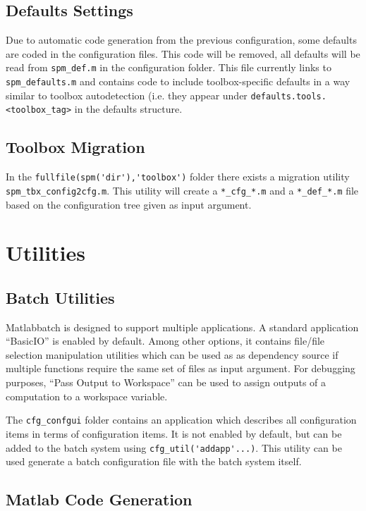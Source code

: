 \documentclass[a4paper]{book}
\begin{document}
\subsection{Defaults Settings}

Due to automatic code generation from the previous configuration, some
defaults are coded in the configuration files. This code will be removed, all
defaults will be read from \verb|spm_def.m| in the configuration folder. This
file currently links to \verb|spm_defaults.m| and contains code to include
toolbox-specific defaults in a way similar to toolbox autodetection (i.e. they
appear under \verb|defaults.tools.<toolbox_tag>| in the defaults structure.

\subsection{Toolbox Migration}

In the \verb|fullfile(spm('dir'),'toolbox')| folder there exists a migration
utility \verb|spm_tbx_config2cfg.m|. This utility will create a
\verb|*_cfg_*.m| and a \verb|*_def_*.m| file based on the configuration tree
given as input argument.

\section{Utilities}

\subsection{Batch Utilities}

Matlabbatch is designed to support multiple applications. A standard
application ``BasicIO'' is enabled by default. Among other options, it
contains file/file selection manipulation utilities which can be used as as
dependency source if multiple functions require the same set of files as input
argument. For debugging purposes, ``Pass Output to Workspace'' can be used to
assign outputs of a computation to a workspace variable.

The \verb|cfg_confgui| folder contains an application which describes all
configuration items in terms of configuration items. It is not enabled by
default, but can be added to the batch system using
\verb|cfg_util('addapp'...)|. This utility can be used generate a batch
configuration file with the batch system itself.

\subsection{Matlab Code Generation}
\end{document}
